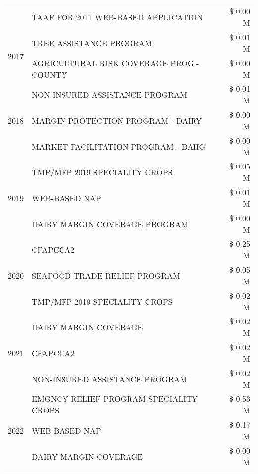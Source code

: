 \begin{tabular}{llr}
 & TAAF FOR 2011 WEB-BASED APPLICATION & \$ 0.00 M \\
\cline{1-3}
\multirow[t]{2}{*}{2017} & TREE ASSISTANCE PROGRAM & \$ 0.01 M \\
 & AGRICULTURAL RISK COVERAGE PROG - COUNTY & \$ 0.00 M \\
\cline{1-3}
\multirow[t]{3}{*}{2018} & NON-INSURED ASSISTANCE PROGRAM & \$ 0.01 M \\
 & MARGIN PROTECTION PROGRAM - DAIRY & \$ 0.00 M \\
 & MARKET FACILITATION PROGRAM - DAHG & \$ 0.00 M \\
\cline{1-3}
\multirow[t]{3}{*}{2019} & TMP/MFP 2019 SPECIALITY CROPS & \$ 0.05 M \\
 & WEB-BASED NAP & \$ 0.01 M \\
 & DAIRY MARGIN COVERAGE PROGRAM & \$ 0.00 M \\
\cline{1-3}
\multirow[t]{3}{*}{2020} & CFAPCCA2 & \$ 0.25 M \\
 & SEAFOOD TRADE RELIEF PROGRAM & \$ 0.05 M \\
 & TMP/MFP 2019 SPECIALITY CROPS & \$ 0.02 M \\
\cline{1-3}
\multirow[t]{3}{*}{2021} & DAIRY MARGIN COVERAGE & \$ 0.02 M \\
 & CFAPCCA2 & \$ 0.02 M \\
 & NON-INSURED ASSISTANCE PROGRAM & \$ 0.02 M \\
\cline{1-3}
\multirow[t]{3}{*}{2022} & EMGNCY RELIEF PROGRAM-SPECIALITY CROPS & \$ 0.53 M \\
 & WEB-BASED NAP & \$ 0.17 M \\
 & DAIRY MARGIN COVERAGE & \$ 0.00 M \\
\cline{1-3}
\bottomrule
\end{tabular}
